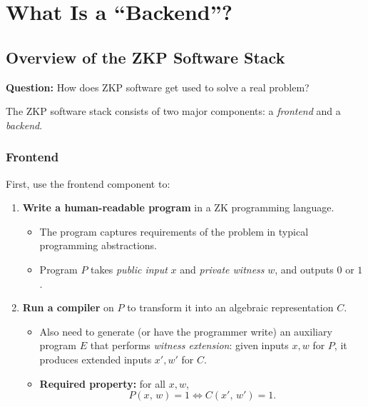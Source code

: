 \documentclass[11pt]{article}
\theoremstyle{plain}
\theoremstyle{definition}
\begin{document}
\section{What Is a ``Backend''?}

\subsection{Overview of the ZKP Software Stack}

\begin{tcolorbox}[colback=blue!5!white, colframe=blue!50!black, title={Central Question}]
  \textbf{Question:} How does ZKP software get used to solve a real problem?
\end{tcolorbox}

\medskip
The ZKP software stack consists of two major components: a \emph{frontend} and a \emph{backend}.

\subsubsection*{Frontend}

First, use the frontend component to:
\begin{enumerate}
  \item \textbf{Write a human-readable program} in a ZK programming language.
    \begin{itemize}
      \item The program captures requirements of the problem in typical programming abstractions.
      \item Program $P$ takes \emph{public input} $x$ and \emph{private witness} $w$, and outputs $0$ or $1$.
    \end{itemize}
  \item \textbf{Run a compiler} on $P$ to transform it into an algebraic representation $C$.
    \begin{itemize}
      \item Also need to generate (or have the programmer write) an auxiliary program $E$ that
            performs \emph{witness extension}: given inputs $x, w$ for $P$, it produces extended inputs
            $x', w'$ for $C$.
      \item \textbf{Required property:} for all $x, w$,
            \[
              P(x,\, w) = 1 \iff C(x',\, w') = 1.
            \]
    \end{itemize}
\end{enumerate}
\end{document}
